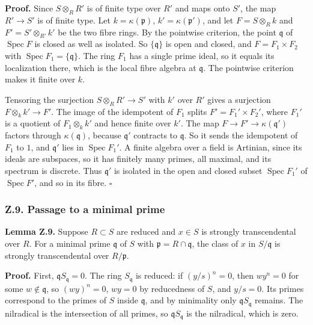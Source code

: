 \documentclass[11pt]{article}
\begin{document}
\textbf{Proof.} Since \(S\otimes_RR'\) is of finite type over \(R'\) and
maps onto \(S'\), the map \(R'\to S'\) is of finite type. Let
\(k=\kappa(\mathfrak p)\), \(k'=\kappa(\mathfrak p')\), and let
\(F=S\otimes_Rk\) and \(F'=S'\otimes_{R'}k'\) be the two fibre rings. By
the pointwise criterion, the point \(\mathfrak q\) of
\(\operatorname{Spec}F\) is closed as well as isolated. So
\(\{\mathfrak q\}\) is open and closed, and \(F=F_1\times F_2\) with
\(\operatorname{Spec}F_1=\{\mathfrak q\}\). The ring \(F_1\) has a
single prime ideal, so it equals its localization there, which is the
local fibre algebra at \(\mathfrak q\). The pointwise criterion makes it
finite over \(k\).

Tensoring the surjection \(S\otimes_RR'\to S'\) with \(k'\) over \(R'\)
gives a surjection \(F\otimes_kk'\to F'\). The image of the idempotent
of \(F_1\) splits \(F'=F_1'\times F_2'\), where \(F_1'\) is a quotient
of \(F_1\otimes_kk'\) and hence finite over \(k'\). The map
\(F\to F'\to\kappa(\mathfrak q')\) factors through
\(\kappa(\mathfrak q)\), because \(\mathfrak q'\) contracts to
\(\mathfrak q\). So it sends the idempotent of \(F_1\) to \(1\), and
\(\mathfrak q'\) lies in \(\operatorname{Spec}F_1'\). A finite algebra
over a field is Artinian, since its ideals are subspaces, so it has
finitely many primes, all maximal, and its spectrum is discrete. Thus
\(\mathfrak q'\) is isolated in the open and closed subset
\(\operatorname{Spec}F_1'\) of \(\operatorname{Spec}F'\), and so in its
fibre. \(\square\)

\subsubsection{Z.9. Passage to a minimal
prime}\label{z.9.-passage-to-a-minimal-prime}

\textbf{Lemma Z.9.} Suppose \(R\subset S\) are reduced and \(x\in S\) is
strongly transcendental over \(R\). For a minimal prime \(\mathfrak q\)
of \(S\) with \(\mathfrak p=R\cap\mathfrak q\), the class of \(x\) in
\(S/\mathfrak q\) is strongly transcendental over \(R/\mathfrak p\).

\textbf{Proof.} First, \(\mathfrak qS_{\mathfrak q}=0\). The ring
\(S_{\mathfrak q}\) is reduced: if \((y/s)^n=0\), then \(wy^n=0\) for
some \(w\notin\mathfrak q\), so \((wy)^n=0\), \(wy=0\) by reducedness of
\(S\), and \(y/s=0\). Its primes correspond to the primes of \(S\)
inside \(\mathfrak q\), and by minimality only
\(\mathfrak qS_{\mathfrak q}\) remains. The nilradical is the
intersection of all primes, so \(\mathfrak qS_{\mathfrak q}\) is the
nilradical, which is zero.
\end{document}
